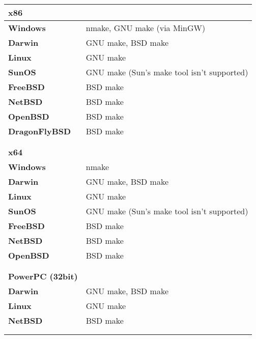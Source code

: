 \begin{tabular}{l l}
{\bf{\large x86}} &                                            \\
\hline\hline
{\bf Windows}      & nmake, GNU make (via MinGW)               \\
{\bf Darwin}       & GNU make, BSD make                        \\
{\bf Linux}        & GNU make                                  \\
{\bf SunOS}        & GNU make (Sun's make tool isn't supported)\\
{\bf FreeBSD}      & BSD make                                  \\
{\bf NetBSD}       & BSD make                                  \\
{\bf OpenBSD}      & BSD make                                  \\
{\bf DragonFlyBSD} & BSD make                                  \\
\hline
                   &                                           \\
                   &                                           \\


{\bf{\large x64}}  &                                           \\
\hline\hline
{\bf Windows}      & nmake                                     \\
{\bf Darwin}       & GNU make, BSD make                        \\
{\bf Linux}        & GNU make                                  \\
{\bf SunOS}        & GNU make (Sun's make tool isn't supported)\\
{\bf FreeBSD}      & BSD make                                  \\
{\bf NetBSD}       & BSD make                                  \\
{\bf OpenBSD}      & BSD make                                  \\
\hline
                   &                                           \\
                   &                                           \\


{\bf{\large PowerPC (32bit)}} &                                \\
\hline\hline
{\bf Darwin}       & GNU make, BSD make                        \\
{\bf Linux}        & GNU make                                  \\
{\bf NetBSD}       & BSD make                                  \\
\hline
                   &                                           \\
                   &                                           \\



\end{tabular}
